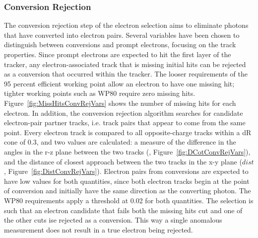 \subsubsection{Conversion Rejection}
\label{evSel:convRej}
The conversion rejection step of the electron selection aims 
to eliminate photons that have converted into electron pairs.  
Several variables have been chosen to distinguish between 
conversions and prompt electrons, focusing on the track properties.  
Since prompt electrons are expected to hit the first layer of the tracker, 
any electron-associated track that is missing initial hits 
can be rejected as a conversion that occurred within the tracker.  
The looser requirements of the 95 percent efficient working point 
allow an electron to have one missing hit;
tighter working points such as WP80 require zero missing hits.  
Figure~\ref{fig:MissHitsConvRejVars} shows the number 
of missing hits for each electron.  
In addition, the conversion rejection algorithm searches 
for candidate electron-pair partner tracks, 
i.e. track pairs that appear to come from the same point.  
Every electron track is compared to all opposite-charge tracks 
within a dR cone of 0.3, and two values are calculated: 
a measure of the difference in the angles in the r-z plane 
between the two tracks (\dCotTheta, Figure~\ref{fig:DCotConvRejVars}), 
and the distance of closest approach between the two tracks 
in the x-y plane ($dist$, Figure~\ref{fig:DistConvRejVars}).  
Electron pairs from conversions are expected 
to have low values for both quantities, 
since both electron tracks begin at the point of conversion 
and initially have the same direction as the converting photon.  
The WP80 requirements apply a threshold at 0.02 for both quantities.  
The selection is such that an electron candidate 
that fails both the missing hits cut 
and one of the other cuts ise rejected as a conversion.  
This way a single anomalous measurement does not 
result in a true electron being rejected.  

